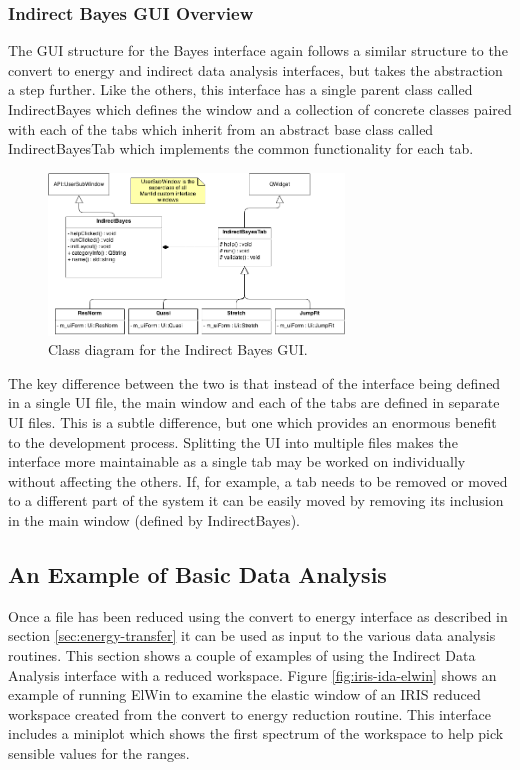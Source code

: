 \documentclass[paper=a4, fontsize=11pt]{scrartcl}	%
\numberwithin{equation}{section}															%
\numberwithin{figure}{section}																%
\numberwithin{table}{section}																%
\begin{document}
\subsubsection{Indirect Bayes GUI Overview}
\label{subsubsec:Bayes-GUI-Overview}
The GUI structure for the Bayes interface again follows a similar structure to the convert to energy and indirect data analysis interfaces, but takes the abstraction a step further. Like the others, this interface has a single parent class called IndirectBayes which defines the window and a collection of concrete classes paired with each of the tabs which inherit from an abstract base class called IndirectBayesTab which implements the common functionality for each tab. 

\begin{figure}[H]
\centering
\includegraphics[width=0.7\textwidth]{img/uml/class_diagrams/Bayes_structure.png}
\caption{Class diagram for the Indirect Bayes GUI.}
\label{fig:indirect-bayes-gui}
\end{figure}

The key difference between the two is that instead of the interface being defined in a single UI file, the main window and each of the tabs are defined in separate UI files. This is a subtle difference, but one which provides an enormous benefit to the development process. Splitting the UI into multiple files makes the interface more maintainable as a single tab may be worked on individually without affecting the others. If, for example, a tab needs to be removed or moved to a different part of the system it can be easily moved by removing its inclusion in the main window (defined by IndirectBayes).

\subsection{An Example of Basic Data Analysis}
Once a file has been reduced using the convert to energy interface as described in section \ref{sec:energy-transfer} it can be used as input to the various data analysis routines. This section shows a couple of examples of using the Indirect Data Analysis interface with a reduced workspace. Figure \ref{fig:iris-ida-elwin} shows an example of running ElWin to examine the elastic window of an IRIS reduced workspace created from the convert to energy reduction routine. This interface includes a miniplot which shows the first spectrum of the workspace to help pick sensible values for the ranges.
\end{document}
